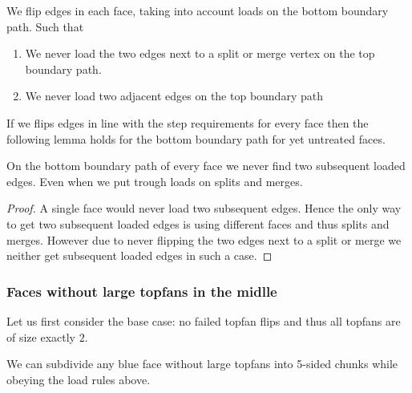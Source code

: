   We flip edges in each face, taking into account loads on the bottom boundary path. Such that

  \begin{enumerate}
    \item We never load the two edges next to a split or merge vertex on the top boundary path.
    \item We never load two adjacent edges on the top boundary path
  \end{enumerate}

  If we flips edges in line with the step requirements for every face then the following lemma holds for the bottom boundary path for yet untreated faces.

  \begin{lemma}
    \label{lm:}
    On the bottom boundary path of every face we never find two subsequent loaded edges. Even when we put trough loads on splits and merges.
  \end{lemma}
  \begin{proof}
    A single face would never load two subsequent edges. Hence the only way to get two subsequent loaded edges is using different faces and thus splits and merges.
    However due to never flipping the two edges next to a split or merge we neither get subsequent loaded edges in such a case.
  \end{proof}


\subsubsection{Faces without large topfans in the midlle}
  Let us first consider the base case: no failed topfan flips and thus all topfans are of size exactly $2$.

  \begin{lemma}
    \label{lm:subdiv:withoutTopfan}
    We can subdivide any blue face without large topfans into 5-sided chunks while obeying the load rules above.
  \end{lemma}

